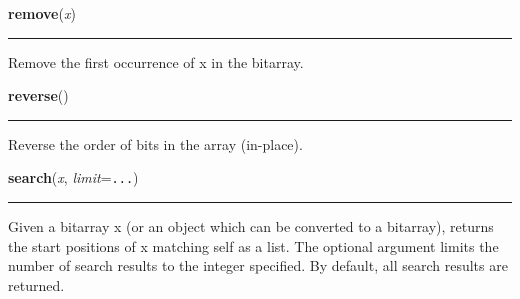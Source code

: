     \label{bitarray:_bitarray:remove}

    \vspace{0.5ex}

    \begin{boxedminipage}{\textwidth}

    \raggedright \textbf{remove}(\textit{x})

    \vspace{-1.5ex}

    \rule{\textwidth}{0.5\fboxrule}

Remove the first occurrence of x in the bitarray.
    \vspace{1ex}

    \end{boxedminipage}

    \label{bitarray:_bitarray:reverse}

    \vspace{0.5ex}

    \begin{boxedminipage}{\textwidth}

    \raggedright \textbf{reverse}()

    \vspace{-1.5ex}

    \rule{\textwidth}{0.5\fboxrule}

Reverse the order of bits in the array (in-place).
    \vspace{1ex}

    \end{boxedminipage}

    \label{bitarray:_bitarray:search}

    \vspace{0.5ex}

    \begin{boxedminipage}{\textwidth}

    \raggedright \textbf{search}(\textit{x}, \textit{limit}=\texttt{...})

    \vspace{-1.5ex}

    \rule{\textwidth}{0.5\fboxrule}

Given a bitarray x (or an object which can be converted to a bitarray),
returns the start positions of x matching self as a list.
The optional argument limits the number of search results to the integer
specified.  By default, all search results are returned.
    \vspace{1ex}

    \end{boxedminipage}


